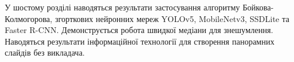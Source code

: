 У шостому розділі наводяться результати 
застосування алгоритму Бойкова-Колмогорова,
згорткових нейронних мереж  YOLOv5, MobileNetv3, SSDLite та
Faster R-CNN. Демонструється робота швидкої медіани для знешумлення. 
Наводяться результати інформаційної технології для створення 
панорамних слайдів без викладача.